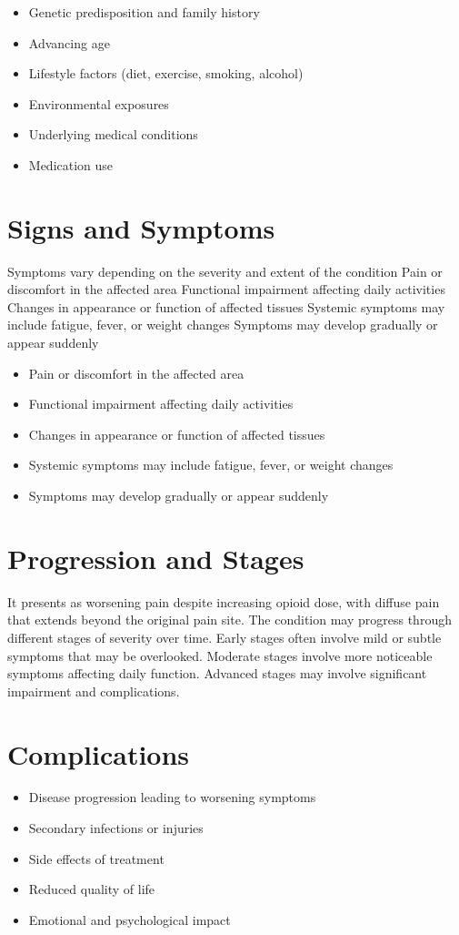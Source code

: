 \begin{itemize}[noitemsep]
  \item Genetic predisposition and family history
  \item Advancing age
  \item Lifestyle factors (diet, exercise, smoking, alcohol)
  \item Environmental exposures
  \item Underlying medical conditions
  \item Medication use
\end{itemize}
\section{Signs and Symptoms}
Symptoms vary depending on the severity and extent of the condition Pain or discomfort in the affected area Functional impairment affecting daily activities Changes in appearance or function of affected tissues Systemic symptoms may include fatigue, fever, or weight changes Symptoms may develop gradually or appear suddenly

\begin{itemize}[noitemsep]
  \item Pain or discomfort in the affected area
  \item Functional impairment affecting daily activities
  \item Changes in appearance or function of affected tissues
  \item Systemic symptoms may include fatigue, fever, or weight changes
  \item Symptoms may develop gradually or appear suddenly
\end{itemize}
\section{Progression and Stages}
It presents as worsening pain despite increasing opioid dose, with diffuse pain that extends beyond the original pain site. The condition may progress through different stages of severity over time. Early stages often involve mild or subtle symptoms that may be overlooked. Moderate stages involve more noticeable symptoms affecting daily function. Advanced stages may involve significant impairment and complications.
\section{Complications}
\begin{itemize}[noitemsep]
  \item Disease progression leading to worsening symptoms
  \item Secondary infections or injuries
  \item Side effects of treatment
  \item Reduced quality of life
  \item Emotional and psychological impact
\end{itemize}

